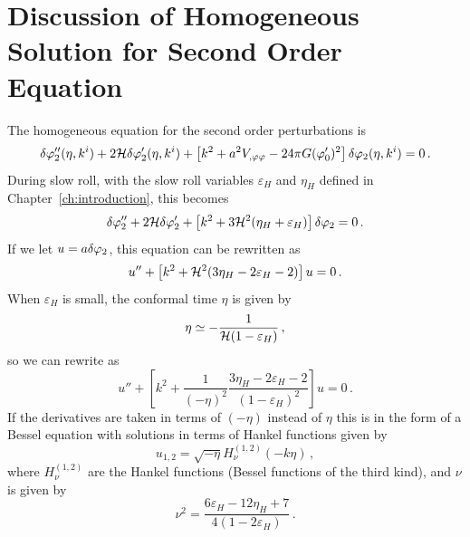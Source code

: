\section{Discussion of Homogeneous Solution for Second Order Equation}
\label{sec:init-apx}

The homogeneous equation for the second order perturbations is  
% 
\begin{equation}
\label{eq:homogen-apx}
 \delta\varphi_{2}''(\eta, k^i) + 2\mathcal{H} \delta\varphi_{2}'(\eta, k^i) 
+ \left[ k^2 + a^2V_{,\varphi\varphi} - 24\pi G (\varphi_0')^2 \right]\delta\varphi_{2}(\eta,k^i) = 0\,.
\end{equation}
% 
During slow roll, with the slow roll variables $\varepsilon_H$ and $\eta_H$ defined in
Chapter~\ref{ch:introduction}, this becomes
% 
\begin{equation}
 \delta\varphi_{2}'' + 2\mathcal{H} \delta\varphi_{2}' + \left[k^2 + 3\mathcal{H}^2(\eta_H + \varepsilon_H)\right]\delta\varphi_{2} = 0\,.
\end{equation}
% 
If we let $u=a\delta\varphi_{2}$, this equation can be rewritten as
% 
\begin{equation}
\label{eq:uH-apx}
 u'' + \left[k^2 +\mathcal{H}^2(3\eta_H - 2\varepsilon_H - 2)\right]u = 0\,.
\end{equation}
% 
When $\varepsilon_H$ is small, the conformal time $\eta$ is given by 
% 
\begin{equation}
 \eta \simeq -\frac{1}{\mathcal{H}(1-\varepsilon_H)}\,,
\end{equation}
% 
so we can rewrite  as
% 
\begin{equation}
 u'' + \left[k^2 + \frac{1}{(-\eta)^2}\frac{3\eta_H -2\varepsilon_H -2}{(1-\varepsilon_H)^2} 
       \right]u = 0\,.
\end{equation}
% 
If the derivatives are taken in terms of $(-\eta)$ instead of $\eta$ this is in the form of a
Bessel equation with solutions in terms of Hankel functions given by
% 
\begin{equation}
 u_{1,2} = \sqrt{-\eta} H_\nu^{(1,2)}(-k\eta)\,, 
\end{equation}
% 
where $H_\nu^{(1,2)}$ are the Hankel functions (Bessel functions of the third kind), and $\nu$ is
given by
% 
\begin{equation}
 \nu^2 = \frac{6\varepsilon_H -12\eta_H + 7}{4(1-2\varepsilon_H)}\,.
\end{equation}
%

